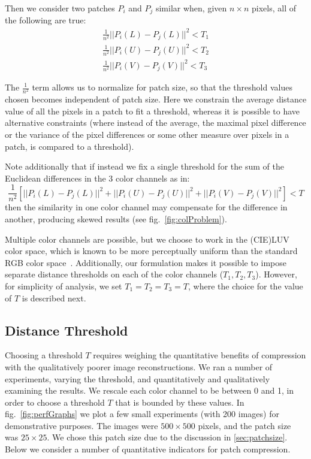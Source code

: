 Then we consider two patches $P_i$ and $P_j$ similar when, given $n\times n$ pixels, all of the following are true:
\begin{align*}
\frac{1}{n^2}||P_i(L) - P_j(L)||^2 < T_1 \\
\frac{1}{n^2}||P_i(U) - P_j(U)||^2 < T_2 \\
\frac{1}{n^2}||P_i(V) - P_j(V)||^2 < T_3
\end{align*}

The $\frac{1}{n^2}$ term allows us to normalize for patch size, so that the threshold values chosen becomes independent of patch size. Here we constrain the average distance value of all the pixels in a patch to fit a threshold, whereas it is possible to have alternative constraints (where instead of the average, the maximal pixel difference or the variance of the pixel differences or some other measure over pixels in a patch, is compared to a threshold).

Note additionally that if instead we fix a single threshold for the sum of the Euclidean differences in the 3 color channels as in:
\begin{displaymath}
\frac{1}{n^2}[||P_i(L) - P_j(L)||^2 + ||P_i(U) - P_j(U)||^2 + ||P_i(V) - P_j(V)||^2] < T
\end{displaymath}
then the similarity in one color channel may compensate for the difference in another, producing skewed results (see fig.~\ref{fig:colProblem}).

Multiple color channels are possible, but we choose to work in the (CIE)LUV color space, which is known to be more perceptually uniform than the standard RGB color space~\cite{kekre2012performance}. Additionally, our formulation makes it possible to impose separate distance thresholds on each of the color channels ($T_1,T_2,T_3$). However, for simplicity of analysis, we set $T_1=T_2=T_3=T$, where the choice for the value of $T$ is described next.

\subsection{Distance Threshold}

Choosing a threshold $T$ requires weighing the quantitative benefits of compression with the qualitatively poorer image reconstructions. We ran a number of experiments, varying the threshold, and quantitatively and qualitatively examining the results. We rescale each color channel to be between 0 and 1, in order to choose a threshold $T$ that is bounded by these values. In fig.~\ref{fig:perfGraphs} we plot a few small experiments (with 200 images) for demonstrative purposes. The images were $500\times 500$ pixels, and the patch size was $25\times 25$. We chose this patch size due to the discussion in \ref{sec:patchsize}. Below we consider a number of quantitative indicators for patch compression.

